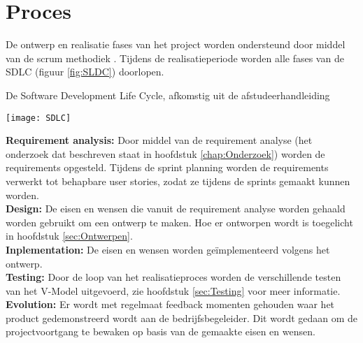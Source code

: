 \section{Proces}
De ontwerp en realisatie fases van het project worden ondersteund door middel van de scrum methodiek \Parencite{Scrum}.
Tijdens de realisatieperiode worden alle fases van de \gls{SDLC} (figuur \ref{fig:SLDC}) doorlopen.\\
\begin{graphic}
	\vspace{0.2cm}
	\captionsetup{type=figure}
	\caption{De Software Development Life Cycle, afkomstig uit de afstudeerhandleiding \Parencite{Afstudeerhandleiding}} %
	\texttt{[image: SDLC]}
	\label{fig:SLDC}
	\vspace{0.2cm}
\end{graphic}
\textbf{Requirement analysis:} Door middel van de requirement analyse (het onderzoek dat beschreven staat in hoofdstuk \ref{chap:Onderzoek}) worden de requirements opgesteld.
Tijdens de sprint planning worden de requirements verwerkt tot behapbare user stories, zodat ze tijdens de sprints gemaakt kunnen worden.\\
\textbf{Design:} De eisen en wensen die vanuit de requirement analyse worden gehaald worden gebruikt om een ontwerp te maken.
Hoe er ontworpen wordt is toegelicht in hoofdstuk \ref{sec:Ontwerpen}.\\
%
\textbf{Inplementation:} De eisen en wensen worden geïmplementeerd volgens het ontwerp.\\
\textbf{Testing:} Door de loop van het realisatieproces worden de verschillende testen van het V-Model uitgevoerd, zie hoofdstuk \ref{sec:Testing} voor meer informatie.\\
\textbf{Evolution:} Er wordt met regelmaat feedback momenten gehouden waar het product gedemonstreerd wordt aan de bedrijfsbegeleider.
Dit wordt gedaan om de projectvoortgang te bewaken op basis van de gemaakte eisen en wensen.
